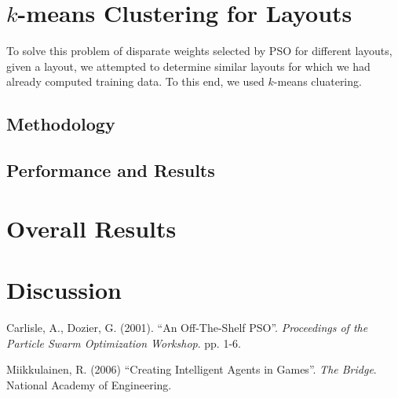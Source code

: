 \documentclass[12pt]{article}
\begin{document}
\section{$k$-means Clustering for Layouts}
To solve this problem of disparate weights selected by PSO for different
layouts, given a layout, we attempted to determine similar layouts for
which we had already computed training data.  To this end, we used
$k$-means cluatering.
\subsection{Methodology}
\subsection{Performance and Results}

\section{Overall Results}

\section{Discussion}


\begin{thebibliography}{99}

 Carlisle, A., Dozier, G. (2001). ``An Off-The-Shelf PSO''.
  {\it Proceedings of the Particle Swarm Optimization Workshop}. pp. 1-6. 

 Miikkulainen, R. (2006) ``Creating Intelligent
  Agents in Games''.  {\it The Bridge}.  National Academy of Engineering.

\end{thebibliography}
\end{document}
